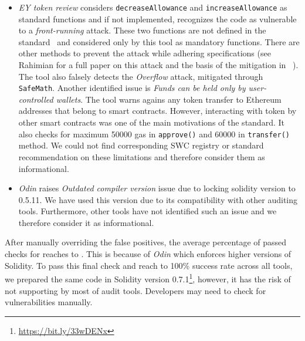 \begin{itemize}
	\item \textit{EY token review} considers \texttt{decreaseAllowance} and \texttt{increaseAllowance} as standard \erc functions and if not implemented, recognizes the code as vulnerable to a \textit{front-running} attack. These two functions are not defined in the \erc standard~\cite{ERC20Std} and considered only by this tool as mandatory functions. There are other methods to prevent the attack while adhering \erc specifications (see Rahimian \etal for a full paper on this attack and the basis of the mitigation in \sys~\cite{ERC20MWA}). The tool also falsely detects the \textit{Overflow} attack, mitigated through \texttt{SafeMath}. Another identified issue is \textit{Funds can be held only by user-controlled wallets}. The tool warns agains any token transfer to Ethereum addresses that belong to smart contracts. However, interacting with \erc token by other smart contracts was one of the main motivations of the \erc standard. It also checks for maximum 50000 gas in \texttt{approve()} and 60000 in \texttt{transfer()} method. We could not find corresponding SWC registry or standard recommendation on these limitations {\chg and therefore consider them as informational.}

	\item \textit{Odin} raises \textit{Outdated compiler version} issue due to locking solidity version to 0.5.11. We have used this version due to its compatibility with other auditing tools. Furthermore, other tools have not identified such an issue {\chg and we therefore consider it as informational}.
\end{itemize}

After manually overriding the false positives, the average percentage of passed checks for \sys reaches to \prct. {\chg This is because of \textit{Odin} which enforces higher versions of Solidity. To pass this final check and reach to 100\% success rate across all tools, we prepared the same code in Solidity version 0.7.1\footnote{\url{https://bit.ly/33wDENx}}, however, it has the risk of not supporting by most of audit tools. Developers may need to check for vulnerabilities manually.}
